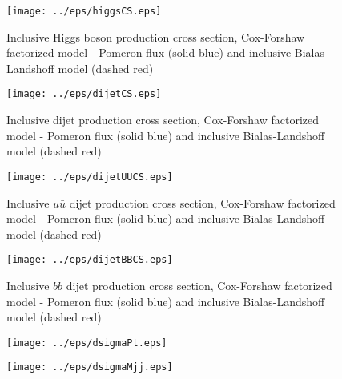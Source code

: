 \documentclass[a4paper,10pt]{article}
\begin{document}
 
\begin{figure}
  \begin{center}
    \texttt{[image: ../eps/higgsCS.eps]}
    \caption{Inclusive Higgs boson production cross section, Cox-Forshaw factorized model - Pomeron flux (solid blue) and inclusive Bialas-Landshoff model (dashed red) }
    \label{incDijetCS}
  \end{center}
\end{figure}

\begin{figure}
  \begin{center}
    \texttt{[image: ../eps/dijetCS.eps]}
    \caption{Inclusive dijet production cross section, Cox-Forshaw factorized model - Pomeron flux (solid blue) and inclusive Bialas-Landshoff model (dashed red) }
    \label{incDijetCS}
  \end{center}
\end{figure}

\begin{figure}
  \begin{center}
    \texttt{[image: ../eps/dijetUUCS.eps]}
    \caption{Inclusive $u\bar{u}$ dijet production cross section, Cox-Forshaw factorized model - Pomeron flux (solid blue) and inclusive Bialas-Landshoff model (dashed red) }
    \label{incDijetCS}
  \end{center}
\end{figure}

\begin{figure}
  \begin{center}
    \texttt{[image: ../eps/dijetBBCS.eps]}
    \caption{Inclusive $b\bar{b}$ dijet production cross section, Cox-Forshaw factorized model - Pomeron flux (solid blue) and inclusive Bialas-Landshoff model (dashed red) }
    \label{incDijetCS}
  \end{center}
\end{figure}

\begin{figure}
  \begin{center}
    \texttt{[image: ../eps/dsigmaPt.eps]}
    \label{incDijetCS}
  \end{center}
\end{figure}

\begin{figure}
  \begin{center}
    \texttt{[image: ../eps/dsigmaMjj.eps]}
    \label{incDijetCS}
  \end{center}
\end{figure}
\end{document}
